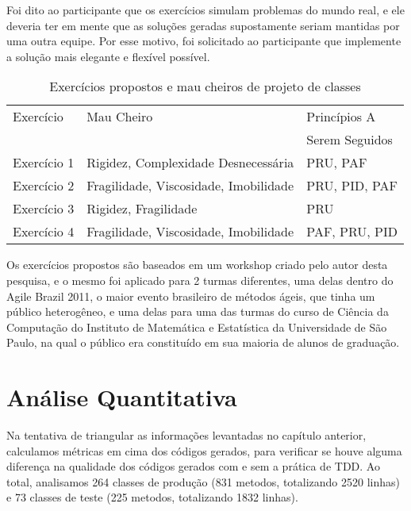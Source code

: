 \documentclass[conference]{IEEEtran}
\begin{document}
Foi dito ao participante que os exercícios simulam problemas do mundo real, e ele deveria
ter em mente que as soluções geradas supostamente seriam mantidas por uma outra equipe.
Por esse motivo, foi solicitado ao participante que implemente a solução mais elegante e flexível 
possível.

\begin{table}
	\centering
	\begin{tabular}{| l | l | l | }
		\hline
		Exercício & Mau Cheiro & Princípios A\\
		& & Serem Seguidos\\
		
		\hline
		
		Exercício 1 & Rigidez, Complexidade Desnecessária & PRU, PAF \\
		Exercício 2 & Fragilidade, Viscosidade, Imobilidade & PRU, PID, PAF \\
		Exercício 3 & Rigidez, Fragilidade & PRU\\
		Exercício 4 & Fragilidade, Viscosidade, Imobilidade & PAF, PRU, PID \\
		
		\hline
	\end{tabular}
	\caption{Exercícios propostos e mau cheiros de projeto de classes}
	\label{tab:problemas-exercicios}
\end{table}

Os exercícios propostos são baseados em um workshop criado pelo autor desta pesquisa, e o mesmo
foi aplicado para 2 turmas diferentes, uma delas dentro do Agile Brazil 2011, o
maior evento brasileiro de métodos ágeis, que tinha um público heterogêneo, e uma delas para
uma das turmas do curso de Ciência da Computação do Instituto de Matemática e Estatística da Universidade
de São Paulo, na qual o público era constituído em sua maioria de alunos de graduação. 

\section{Análise Quantitativa}

Na tentativa de triangular as informações levantadas no capítulo anterior,
calculamos métricas em cima dos códigos gerados, para verificar se houve
alguma diferença na qualidade dos códigos gerados com e sem a prática de TDD.
Ao total, analisamos
264 classes de produção (831 metodos, totalizando 2520 linhas) e
73 classes de teste (225 metodos, totalizando 1832 linhas).
\end{document}
